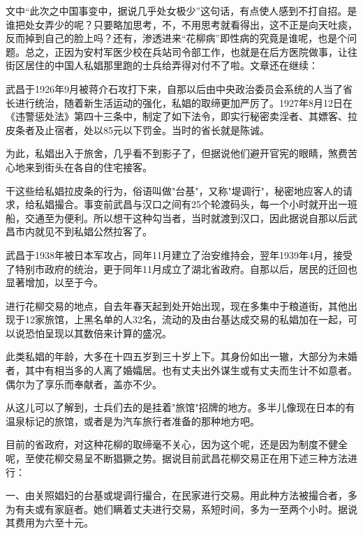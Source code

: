 \documentclass[12pt,UTF8]{ctexbook}
\begin{document}
文中“此次之中国事变中，据说几乎处女极少”这句话，有点使人感到不打自招。是谁把处女弄少的呢？只要略加思考，不，不用思考就看得出，这不正是向天吐痰，反而掉到自己的脸上吗？还有，渗透进来“花柳病”即性病的究竟是谁呢，也是个问题。总之，正因为安村军医少校在兵站司令部工作，也就是在后方医院做事，让往街区居住的中国人私娼那里跑的士兵给弄得对付不了啦。文章还在继续：

武昌于1926年9月被蒋介石攻打下来，自那以后由中央政治委员会系统的人当了省长进行统治，随着新生活运动的强化，私娼的取缔更加严厉了。1927年8月12日在《违警惩处法》第四十三条中，制定了如下法令，即实行秘密卖淫者、其嫖客、拉皮条者及止宿者，处以85元以下罚金。当时的省长就是陈诚。



为此，私娼出入于旅舍，几乎看不到影子了，但据说他们避开官宪的眼睛，煞费苦心地来到街头在各自的住宅接客。



干这些给私娼拉皮条的行为，俗语叫做"台基"，又称"堤调行"，秘密地应客人的请求，给私娼撮合。事变前武昌与汉口之间有25个轮渡码头，每一个小时就开出一班船，交通至为便利。所以想干这种勾当者，当时就渡到汉口，因此据说自那以后武昌市内就见不到私娼公然拉客了。



武昌于1938年被日本军攻占，同年11月建立了治安维持会，翌年1939年4月，接受了特别市政府的统治，更于同年11月成立了湖北省政府。自那以后，居民的迁回也显著增加，以至于今。



进行花柳交易的地点，自去年春天起到处开始出现，现在多集中于粮道街，其他出现于12家旅馆，上黑名单的人32名，流动的及由台基达成交易的私娼加在一起，可以说恐怕呈现以其数倍来计算的盛况。



此类私娼的年龄，大多在十四五岁到三十岁上下。其身份如出一辙，大部分为未婚者，其中有相当多的人离了婚孀居。也有丈夫出外谋生或有丈夫而生计不如意者。偶尔为了享乐而奉献者，盖亦不少。



从这儿可以了解到，士兵们去的是挂着"旅馆"招牌的地方。多半儿像现在日本的有温泉标记的旅馆，或者是为汽车旅行者准备的那种地方吧。



目前的省政府，对这种花柳的取缔毫不关心，因为这个呢，还是因为制度不健全呢，至使花柳交易呈不断猖獗之势。据说目前武昌花柳交易正在用下述三种方法进行：



一、由关照娼妇的台基或堤调行撮合，在民家进行交易。用此种方法被撮合者，多为有夫或有家庭者。她们瞒着丈夫进行交易，系短时间，多为一至两个小时。据说其费用为六至十元。
\end{document}
